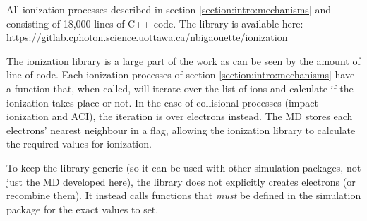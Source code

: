 All ionization processes described in section
\ref{section:intro:mechanisms} and consisting of 18,000 lines of C++ code.
The library is available here:
\url{https://gitlab.cphoton.science.uottawa.ca/nbigaouette/ionization}

The ionization library is a large part of the work as can be seen by the amount
of line of code. Each ionization processes of section
\ref{section:intro:mechanisms} have a function that, when called, will iterate
over the list of ions and calculate if the ionization takes place or not. In the
case of collisional processes (impact ionization and ACI), the iteration is over
electrons instead. The MD stores each electrons' nearest neighbour in a flag,
allowing the ionization library to calculate the required values for ionization.

To keep the library generic (so it can be used with other simulation packages,
not just the MD developed here), the library does not explicitly creates
electrons (or recombine them). It instead calls functions that \textit{must}
be defined in the simulation package for the exact values to set.


